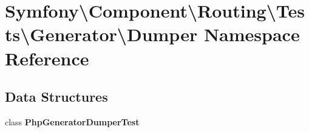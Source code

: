 \section{Symfony\textbackslash{}Component\textbackslash{}Routing\textbackslash{}Tests\textbackslash{}Generator\textbackslash{}Dumper Namespace Reference}
\label{namespace_symfony_1_1_component_1_1_routing_1_1_tests_1_1_generator_1_1_dumper}
\subsection*{Data Structures}
\begin{DoxyCompactItemize}
\item 
class {\bf Php\+Generator\+Dumper\+Test}
\end{DoxyCompactItemize}
